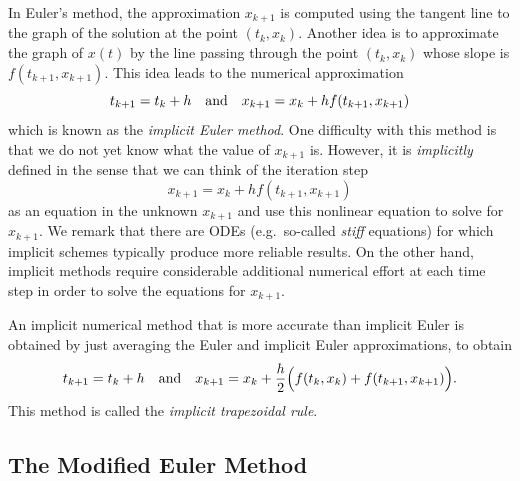 \documentclass{ximera}
\begin{document}
In Euler's method, the approximation $x_{k+1}$ is computed using the 
tangent line to the graph of the solution at the point $(t_k,x_k)$.  
Another idea is to approximate the graph of $x(t)$ by the line passing 
through the point $(t_k,x_k)$ whose slope is $f(t_{k+1},x_{k+1})$.  
This idea leads to the numerical approximation
\[
t_{k+1} = t_k+h \quad\mbox{and}\quad x_{k+1} = x_k + h f(t_{k+1}, x_{k+1})
\]
which is known as the {\em implicit Euler method}.  
 
One difficulty with 
this method is that we do not yet know what the value of $x_{k+1}$ is.
However, it is {\em implicitly\/} defined in the sense that
we can think of the iteration step 
\begin{equation}
\label{eq:impleulit}
x_{k+1} = x_k + h f(t_{k+1}, x_{k+1})
\end{equation}
as an equation in the unknown $x_{k+1}$ and use this nonlinear equation 
to solve for $x_{k+1}$.  We remark that there are
ODEs (e.g.\ so-called {\em stiff\/} equations) for which implicit 
schemes typically produce more reliable results.  On the other hand, 
implicit methods require considerable additional numerical effort at 
each time step in order to solve the equations for $x_{k+1}$. 

An implicit numerical method that is more accurate than implicit Euler 
is obtained by just averaging the Euler and implicit Euler 
approximations, to obtain
\begin{equation}
\label{eq:imtrap}
t_{k+1} = t_k+h \quad\mbox{and}\quad x_{k+1} = x_k + \frac{h}{2}
\Big( f(t_k, x_k)+f(t_{k+1}, x_{k+1})\Big).
\end{equation}
This method is called the {\em implicit trapezoidal rule}.  

\subsection*{The Modified Euler Method} 
\end{document}
